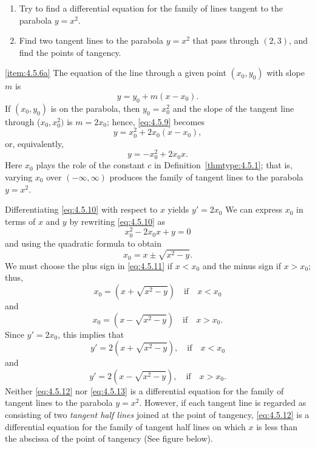 \documentclass{ximera}
\begin{document}
\begin{example}\label{example:4.5.6}
 
\begin{enumerate}
\item\label{item:4.5.6a} %
Try to find a differential equation for the family of lines tangent
to the parabola $y=x^2$.
 
\item\label{item:4.5.6b} %
Find two tangent lines to  the parabola $y=x^2$ that pass
through $(2,3)$, and find the points of tangency.
\end{enumerate}
 
 
\begin{explanation} \ref{item:4.5.6a} The equation of the line through a given point
$(x_0,y_0)$ with slope $m$ is
\begin{equation}  \label{eq:4.5.9}
y=y_0+m(x-x_0).
\end{equation}
If $(x_0,y_0)$ is on the parabola, then $y_0=x_0^2$ and the slope of
the tangent line through ($x_0,x_0^2)$ is $m=2x_0$; hence,
\eqref{eq:4.5.9} becomes
$$
y=x_0^2+2x_0(x-x_0),
$$
 or, equivalently,
\begin{equation} \label{eq:4.5.10}
y=-x_0^2+2x_0x.
\end{equation}
Here $x_0$ plays the role of the constant $c$ in
Definition~\ref{thmtype:4.5.1}; that is, varying $x_0$ over
$(-\infty,\infty)$ produces the family of tangent lines to the
parabola $y=x^2$.
 
 
Differentiating \eqref{eq:4.5.10} with respect to $x$ yields
$y'=2x_0$
We can express $x_0$ in terms of $x$ and $y$ by rewriting
\eqref{eq:4.5.10} as
$$
x_0^2-2x_0x+y=0
$$
and using the quadratic formula to obtain
 \begin{equation}\label{eq:4.5.11}
 x_0=x\pm\sqrt{x^2-y}.
\end{equation}
We must choose the plus sign in \eqref{eq:4.5.11} if $x<x_0$
and the minus sign if $x>x_0$;   thus,
$$
x_0=\left(x+\sqrt{x^2-y}\right)\quad\mbox{if}\quad x<x_0
$$
 and
$$
x_0=\left(x-\sqrt{x^2-y}\right)\quad\mbox{if}\quad x>x_0.
$$
Since $y'=2x_0$, this implies that
\begin{equation} \label{eq:4.5.12}
y'=2\left(x+\sqrt{x^2-y}\right),\quad\mbox{if}\quad x<x_0
\end{equation}
 and
\begin{equation} \label{eq:4.5.13}
y'=2\left(x-\sqrt{x^2-y}\right),\quad \mbox{if}\quad x>x_0.
\end{equation}
Neither \eqref{eq:4.5.12} nor \eqref{eq:4.5.13} is a differential equation for
the family of tangent lines to the parabola $y=x^2$. However, if each
tangent line is regarded as consisting of two \textit{tangent half
lines} joined at the point of tangency,   \eqref{eq:4.5.12} is a
differential equation for the family of tangent half lines on which
$x$ is less than the abscissa of the point of tangency
(See figure below).
 

\end{explanation}
\end{example}
\end{document}

